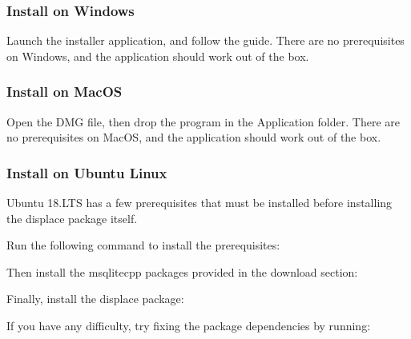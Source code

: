 \subsubsection*{Install on Windows}

Launch the installer application, and follow the guide. There are no prerequisites on Windows, and the application should work out of the box.

\subsubsection*{Install on Mac\+OS}

Open the D\+MG file, then drop the program in the Application folder. There are no prerequisites on Mac\+OS, and the application should work out of the box.

\subsubsection*{Install on Ubuntu Linux}

Ubuntu 18.\+L\+TS has a few prerequisites that must be installed before installing the displace package itself.

Run the following command to install the prerequisites\+:


\begin{DoxyCode}{0}
\end{DoxyCode}


Then install the {\ttfamily msqlitecpp} packages provided in the download section\+:


\begin{DoxyCode}{0}
\end{DoxyCode}


Finally, install the displace package\+:


\begin{DoxyCode}{0}
\end{DoxyCode}


If you have any difficulty, try fixing the package dependencies by running\+:


\begin{DoxyCode}{0}
\end{DoxyCode}


